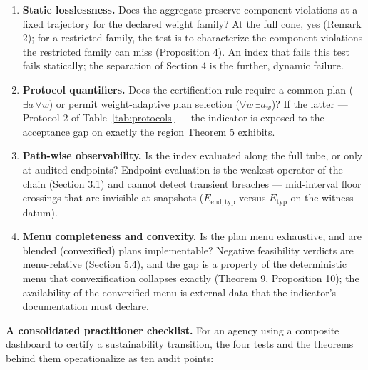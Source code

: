 \documentclass[3p,11pt]{elsarticle}
\providecommand{\tightlist}{\setlength{\itemsep}{0pt}\setlength{\parskip}{0pt}}
\begin{document}
\begin{enumerate}
\tightlist
\item
  \textbf{Static losslessness.} Does the aggregate preserve component
  violations at a fixed trajectory for the declared weight family? At the
  full cone, yes (Remark 2); for a restricted family, the test is to
  characterize the component violations the restricted family can miss
  (Proposition 4). An index that fails this test fails statically; the
  separation of Section 4 is the further, dynamic failure.
\item
  \textbf{Protocol quantifiers.} Does the certification rule require a
  common plan (\(\exists a\, \forall w\)) or permit weight-adaptive plan
  selection (\(\forall w\, \exists a_w\))? If the latter --- Protocol 2
  of Table~\ref{tab:protocols} --- the indicator is exposed to the
  acceptance gap on exactly the region Theorem 5 exhibits.
\item
  \textbf{Path-wise observability.} Is the index evaluated along the
  full tube, or only at audited endpoints? Endpoint evaluation is the
  weakest operator of the chain (Section 3.1) and cannot detect transient
  breaches --- mid-interval floor crossings that are invisible at
  snapshots (\(E_{\mathrm{end,typ}}\) versus \(E_{\mathrm{typ}}\) on
  the witness datum).
\item
  \textbf{Menu completeness and convexity.} Is the plan menu exhaustive,
  and are blended (convexified) plans implementable? Negative feasibility
  verdicts are menu-relative (Section 5.4), and the gap is a property of
  the deterministic menu that convexification collapses exactly (Theorem
  9, Proposition 10); the availability of the convexified menu is
  external data that the indicator's documentation must declare.
\end{enumerate}

\textbf{A consolidated practitioner checklist.} For an agency using a
composite dashboard to certify a sustainability transition, the four
tests and the theorems behind them operationalize as ten audit points:
\end{document}
